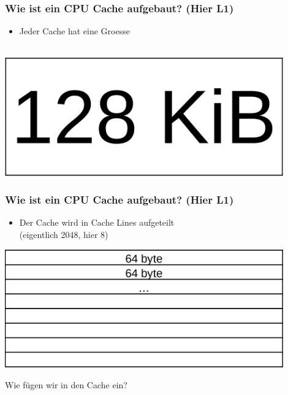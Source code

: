 \documentclass{beamer}
\begin{document}
\begin{frame}
\frametitle{Wie ist ein CPU Cache aufgebaut? (Hier L1)}
\begin{itemize}
    \item Jeder Cache hat eine Groesse\\~\\
\end{itemize}
\centerline{\includegraphics[width=12cm]{cell1.png}}
\end{frame}

\begin{frame}
\frametitle{Wie ist ein CPU Cache aufgebaut? (Hier L1)}
\begin{itemize}
    \item Der Cache wird in Cache Lines aufgeteilt\\(eigentlich 2048, hier 8)\\
\end{itemize}
\centerline{\includegraphics[width=12cm]{cell2.png}}
\end{frame}

\begin{frame}
{
\centering
\huge
Wie f\"ugen wir in den Cache ein?
}
\end{frame}
\end{document}
